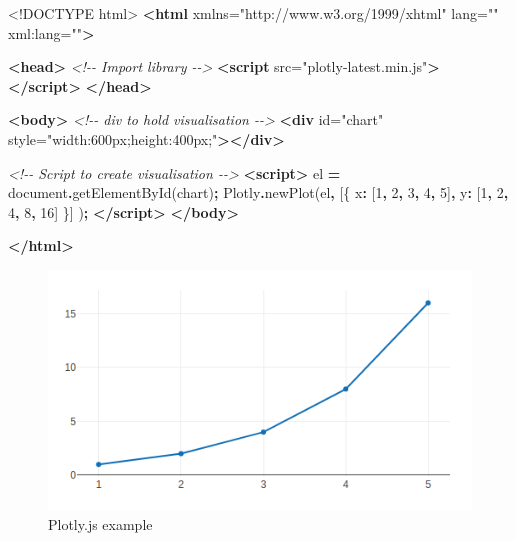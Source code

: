 \documentclass[
]{krantz}
\makeatletter
\newenvironment{Shaded}{\begin{snugshade}}{\end{snugshade}}
\newcommand{\BuiltInTok}[1]{#1}
\newcommand{\CommentTok}[1]{\textcolor[rgb]{0.37,0.37,0.37}{\textit{#1}}}
\newcommand{\DataTypeTok}[1]{\textcolor[rgb]{0.27,0.27,0.27}{#1}}
\newcommand{\DecValTok}[1]{\textcolor[rgb]{0.06,0.06,0.06}{#1}}
\newcommand{\FunctionTok}[1]{\textcolor[rgb]{0,0,0}{#1}}
\newcommand{\KeywordTok}[1]{\textcolor[rgb]{0.27,0.27,0.27}{\textbf{#1}}}
\newcommand{\NormalTok}[1]{#1}
\newcommand{\OperatorTok}[1]{\textcolor[rgb]{0.43,0.43,0.43}{\textbf{#1}}}
\newcommand{\OtherTok}[1]{\textcolor[rgb]{0.37,0.37,0.37}{#1}}
\newcommand{\StringTok}[1]{\textcolor[rgb]{0.5,0.5,0.5}{#1}}
\newenvironment{kframe}{%
\medskip{}
\setlength{\fboxsep}{.8em}
 \def\at@end@of@kframe{}%
 \ifinner\ifhmode%
  \def\at@end@of@kframe{\end{minipage}}%
  \begin{minipage}{\columnwidth}%
 \fi\fi%
 \def\FrameCommand##1{\hskip\@totalleftmargin \hskip-\fboxsep
 \colorbox{shadecolor}{##1}\hskip-\fboxsep
     \hskip-\linewidth \hskip-\@totalleftmargin \hskip\columnwidth}%
 \MakeFramed {\advance\hsize-\width
   \@totalleftmargin\z@ \linewidth\hsize
   \@setminipage}}%
 {\par\unskip\endMakeFramed%
 \at@end@of@kframe}
\renewenvironment{Shaded}{\begin{kframe}}{\end{kframe}}
\makeatother
\begin{document}
\begin{Shaded}
\begin{Highlighting}[]
\DataTypeTok{\textless{}!DOCTYPE }\NormalTok{html}\DataTypeTok{\textgreater{}}
\KeywordTok{\textless{}html}\OtherTok{ xmlns=}\StringTok{"http://www.w3.org/1999/xhtml"}\OtherTok{ lang=}\StringTok{""}\OtherTok{ xml:lang=}\StringTok{""}\KeywordTok{\textgreater{}}

\KeywordTok{\textless{}head\textgreater{}}
  \CommentTok{\textless{}!{-}{-} Import library {-}{-}\textgreater{}}
  \KeywordTok{\textless{}script}\OtherTok{ src=}\StringTok{"plotly{-}latest.min.js"}\KeywordTok{\textgreater{}\textless{}/script\textgreater{}}
\KeywordTok{\textless{}/head\textgreater{}}

\KeywordTok{\textless{}body\textgreater{}}
  \CommentTok{\textless{}!{-}{-} div to hold visualisation {-}{-}\textgreater{}}
  \KeywordTok{\textless{}div}\OtherTok{ id=}\StringTok{"chart"}\OtherTok{ style=}\StringTok{"width:600px;height:400px;"}\KeywordTok{\textgreater{}\textless{}/div\textgreater{}}

  \CommentTok{\textless{}!{-}{-} Script to create visualisation {-}{-}\textgreater{}}
  \KeywordTok{\textless{}script\textgreater{}}
\NormalTok{    el }\OperatorTok{=} \BuiltInTok{document}\OperatorTok{.}\FunctionTok{getElementById}\NormalTok{(}\StringTok{\textquotesingle{}chart\textquotesingle{}}\NormalTok{)}\OperatorTok{;}
\NormalTok{    Plotly}\OperatorTok{.}\FunctionTok{newPlot}\NormalTok{(el}\OperatorTok{,}\NormalTok{ [\{}
      \DataTypeTok{x}\OperatorTok{:}\NormalTok{ [}\DecValTok{1}\OperatorTok{,} \DecValTok{2}\OperatorTok{,} \DecValTok{3}\OperatorTok{,} \DecValTok{4}\OperatorTok{,} \DecValTok{5}\NormalTok{]}\OperatorTok{,}
      \DataTypeTok{y}\OperatorTok{:}\NormalTok{ [}\DecValTok{1}\OperatorTok{,} \DecValTok{2}\OperatorTok{,} \DecValTok{4}\OperatorTok{,} \DecValTok{8}\OperatorTok{,} \DecValTok{16}\NormalTok{] \}]}
\NormalTok{    )}\OperatorTok{;}
  \KeywordTok{\textless{}/script\textgreater{}}
\KeywordTok{\textless{}/body\textgreater{}}

\KeywordTok{\textless{}/html\textgreater{}}
\end{Highlighting}
\end{Shaded}

\begin{figure}
\centering
\includegraphics{images/candidate-plotly.png}
\caption{Plotly.js example}
\end{figure}
\end{document}
